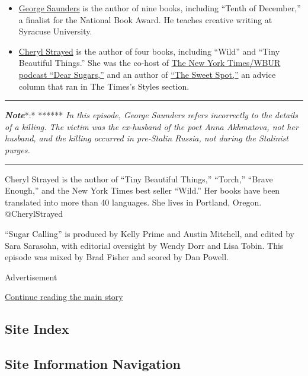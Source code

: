\begin{itemize}
\item
  \href{http://www.georgesaundersbooks.com/}{George Saunders} is the
  author of nine books, including ``Tenth of December,'' a finalist for
  the National Book Award. He teaches creative writing at Syracuse
  University.
\item
  \href{http://www.cherylstrayed.com/}{Cheryl Strayed} is the author of
  four books, including ``Wild'' and ``Tiny Beautiful Things.'' She was
  the co-host of
  \href{https://www.nytimes3xbfgragh.onion/column/dear-sugars}{The New
  York Times/WBUR podcast ``Dear Sugars,''} and an author of
  \href{https://www.nytimes3xbfgragh.onion/column/the-sweet-spot}{``The
  Sweet Spot,''} an advice column that ran in The Times's Styles
  section.
\end{itemize}

\begin{center}\rule{0.5\linewidth}{\linethickness}\end{center}

\emph{\textbf{Note}}*:* ****** \emph{In this episode, George Saunders
refers incorrectly to the details of a killing. The victim was the
ex-husband of the poet Anna Akhmatova, not her husband, and the killing
occurred in pre-Stalin Russia, not during the Stalinist purges.}

\begin{center}\rule{0.5\linewidth}{\linethickness}\end{center}

Cheryl Strayed is the author of ``Tiny Beautiful Things,'' ``Torch,''
``Brave Enough,'' and the New York Times best seller ``Wild.'' Her books
have been translated into more than 40 languages. She lives in Portland,
Oregon. @CherylStrayed

``Sugar Calling'' is produced by Kelly Prime and Austin Mitchell, and
edited by Sara Sarasohn, with editorial oversight by Wendy Dorr and Lisa
Tobin. This episode was mixed by Brad Fisher and scored by Dan Powell.

Advertisement

\protect\hyperlink{after-bottom}{Continue reading the main story}

\hypertarget{site-index}{%
\subsection{Site Index}\label{site-index}}

\hypertarget{site-information-navigation}{%
\subsection{Site Information
Navigation}\label{site-information-navigation}}

